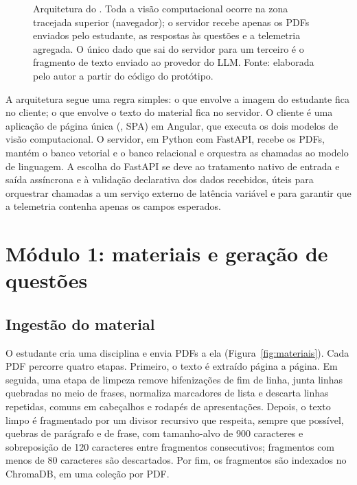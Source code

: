 \begin{figure}[htbp]
\caption{Arquitetura do \ferramenta. Toda a visão computacional ocorre na zona tracejada superior (navegador); o servidor recebe apenas os PDFs enviados pelo estudante, as respostas às questões e a telemetria agregada. O único dado que sai do servidor para um terceiro é o fragmento de texto enviado ao provedor do LLM. Fonte: elaborada pelo autor a partir do código do protótipo.}
\label{fig:arquitetura}
\end{figure}

A arquitetura segue uma regra simples: o que envolve a imagem do estudante fica no cliente; o que envolve o texto do material fica no servidor. O cliente é uma aplicação de página única (, SPA) em Angular, que executa os dois modelos de visão computacional. O servidor, em Python com FastAPI, recebe os PDFs, mantém o banco vetorial e o banco relacional e orquestra as chamadas ao modelo de linguagem. A escolha do FastAPI se deve ao tratamento nativo de entrada e saída assíncrona e à validação declarativa dos dados recebidos, úteis para orquestrar chamadas a um serviço externo de latência variável e para garantir que a telemetria contenha apenas os campos esperados.

\section{\label{sec:mod1}Módulo 1: materiais e geração de questões}

\subsection{Ingestão do material}

O estudante cria uma disciplina e envia PDFs a ela (Figura~\ref{fig:materiais}). Cada PDF percorre quatro etapas. Primeiro, o texto é extraído página a página. Em seguida, uma etapa de limpeza remove hifenizações de fim de linha, junta linhas quebradas no meio de frases, normaliza marcadores de lista e descarta linhas repetidas, comuns em cabeçalhos e rodapés de apresentações. Depois, o texto limpo é fragmentado por um divisor recursivo que respeita, sempre que possível, quebras de parágrafo e de frase, com tamanho-alvo de 900 caracteres e sobreposição de 120 caracteres entre fragmentos consecutivos; fragmentos com menos de 80 caracteres são descartados. Por fim, os fragmentos são indexados no ChromaDB, em uma coleção por PDF.

